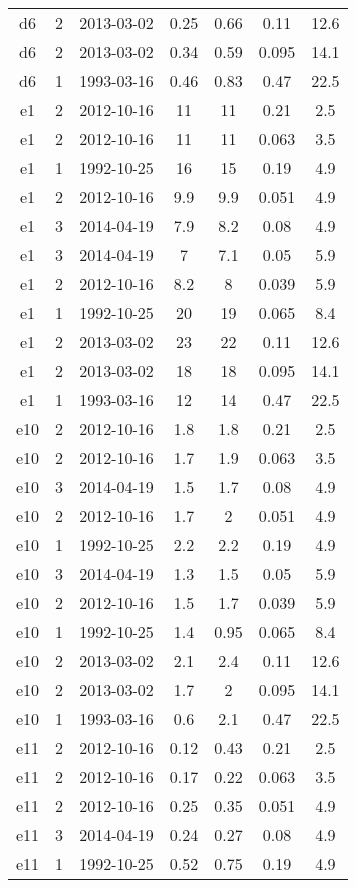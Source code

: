 \begin{longtable}[htp]
\begin{longtable}{ccccccc}
d6 & 2 & 2013-03-02 & 0.25 & 0.66 & 0.11 & 12.6 \\
d6 & 2 & 2013-03-02 & 0.34 & 0.59 & 0.095 & 14.1 \\
d6 & 1 & 1993-03-16 & 0.46 & 0.83 & 0.47 & 22.5 \\
e1 & 2 & 2012-10-16 & 11 & 11 & 0.21 & 2.5 \\
e1 & 2 & 2012-10-16 & 11 & 11 & 0.063 & 3.5 \\
e1 & 1 & 1992-10-25 & 16 & 15 & 0.19 & 4.9 \\
e1 & 2 & 2012-10-16 & 9.9 & 9.9 & 0.051 & 4.9 \\
e1 & 3 & 2014-04-19 & 7.9 & 8.2 & 0.08 & 4.9 \\
e1 & 3 & 2014-04-19 & 7 & 7.1 & 0.05 & 5.9 \\
e1 & 2 & 2012-10-16 & 8.2 & 8 & 0.039 & 5.9 \\
e1 & 1 & 1992-10-25 & 20 & 19 & 0.065 & 8.4 \\
e1 & 2 & 2013-03-02 & 23 & 22 & 0.11 & 12.6 \\
e1 & 2 & 2013-03-02 & 18 & 18 & 0.095 & 14.1 \\
e1 & 1 & 1993-03-16 & 12 & 14 & 0.47 & 22.5 \\
e10 & 2 & 2012-10-16 & 1.8 & 1.8 & 0.21 & 2.5 \\
e10 & 2 & 2012-10-16 & 1.7 & 1.9 & 0.063 & 3.5 \\
e10 & 3 & 2014-04-19 & 1.5 & 1.7 & 0.08 & 4.9 \\
e10 & 2 & 2012-10-16 & 1.7 & 2 & 0.051 & 4.9 \\
e10 & 1 & 1992-10-25 & 2.2 & 2.2 & 0.19 & 4.9 \\
e10 & 3 & 2014-04-19 & 1.3 & 1.5 & 0.05 & 5.9 \\
e10 & 2 & 2012-10-16 & 1.5 & 1.7 & 0.039 & 5.9 \\
e10 & 1 & 1992-10-25 & 1.4 & 0.95 & 0.065 & 8.4 \\
e10 & 2 & 2013-03-02 & 2.1 & 2.4 & 0.11 & 12.6 \\
e10 & 2 & 2013-03-02 & 1.7 & 2 & 0.095 & 14.1 \\
e10 & 1 & 1993-03-16 & 0.6 & 2.1 & 0.47 & 22.5 \\
e11 & 2 & 2012-10-16 & 0.12 & 0.43 & 0.21 & 2.5 \\
e11 & 2 & 2012-10-16 & 0.17 & 0.22 & 0.063 & 3.5 \\
e11 & 2 & 2012-10-16 & 0.25 & 0.35 & 0.051 & 4.9 \\
e11 & 3 & 2014-04-19 & 0.24 & 0.27 & 0.08 & 4.9 \\
e11 & 1 & 1992-10-25 & 0.52 & 0.75 & 0.19 & 4.9 \\

\end{longtable}
\end{longtable}
